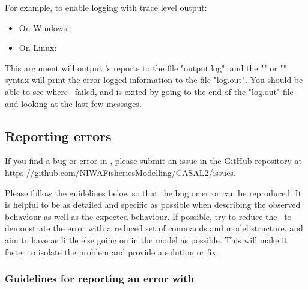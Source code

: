 For example, to enable logging with trace level output:

\begin{itemize}
	\item On Windows: 
	\item On Linux: 
\end{itemize}

This argument will output \CNAME's reports to the file "output.log", and the "" or "" syntax will print the error logged information to the file "log.out". You should be able to see where \CNAME\ failed, and is exited by going to the end of the "log.out" file and looking at the last few messages.

\subsection{Reporting errors\label{sec:ReportingErrors}}

If you find a bug or error in \CNAME, please submit an issue in the GitHub repository at \url{https://github.com/NIWAFisheriesModelling/CASAL2/issues}.

Please follow the guidelines below so that the bug or error can be reproduced. It is helpful to be as detailed and specific as possible when describing the observed behaviour as well as the expected behaviour. If possible, try to reduce the \config\ to demonstrate the error with a reduced set of commands and model structure, and aim to have as little else going on in the model as possible. This will make it faster to isolate the problem and provide a solution or fix.

\subsubsection{Guidelines for reporting an error with \CNAME\label{sec:ErrorGuidelines}}

